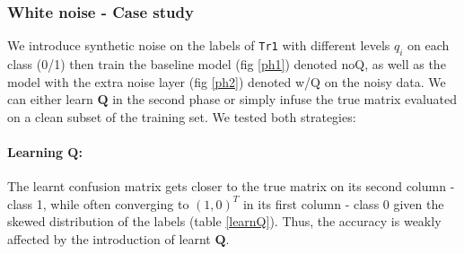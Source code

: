 \documentclass[a4paper]{article}
\newcommand{\Q}{\mathbf{Q}}
\begin{document}
        \subsubsection{White noise - Case study}
            We introduce synthetic noise on the labels of \texttt{Tr1} with different levels $q_i$ on each class (0/1) then train the baseline model (fig \ref{ph1}) denoted noQ, as well as the model with the extra noise layer (fig \ref{ph2}) denoted w/Q on the noisy data. We can either learn $\Q$ in the second phase or simply infuse the true matrix evaluated on a clean subset of the training set. We tested both strategies:
            \paragraph{Learning $\Q$:}
            The learnt confusion matrix gets closer to the true matrix on its second column - class 1, while often converging to $(1,0)^T$ in its first column - class 0 given the skewed distribution of the labels (table \ref{learnQ}). Thus, the accuracy is weakly affected by the introduction of learnt $\Q$.
\end{document}
